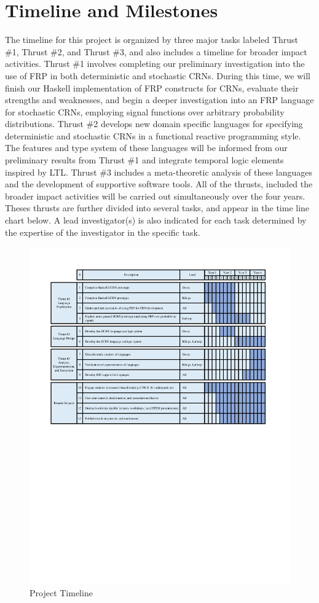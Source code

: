 
\section{Timeline and Milestones}
\label{sec:timeline}

The timeline for this project is organized by three major tasks labeled Thrust \#1, Thrust \#2, and Thrust \#3, and also includes a timeline for broader impact activities.
Thrust \#1 involves completing our preliminary investigation into the use of FRP in both deterministic and stochastic CRNs.
During this time, we will finish our Haskell implementation of FRP constructs for CRNs, evaluate their strengths and weaknesses, and begin a deeper investigation into an FRP language for stochastic CRNs, employing signal functions over arbitrary probability distributions.
Thrust \#2 develops new domain specific languages for specifying deterministic and stochastic CRNs in a functional reactive programming style.
The features and type system of these languages will be informed from our preliminary results from Thrust \#1 and integrate temporal logic elements inspired by LTL.
Thrust \#3 includes a meta-theoretic analysis of these languages and the development of supportive software tools.
All of the thrusts, included the broader impact activities will be carried out simultaneously over the four years.
Theses thrusts are further divided into several tasks, and appear in the time line chart below.
A lead investigator(s) is also indicated for each task determined by the expertise of the investigator in the specific task.

\begin{figure}[h!]
     \centering
     \includegraphics[width=6.4in]{TimeLine.pdf}
     \caption{Project Timeline}
 \end{figure}


